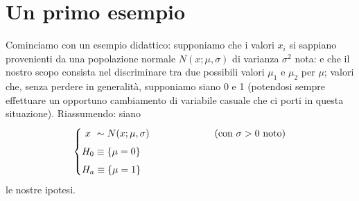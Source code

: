 \section{Un primo esempio}%
\label{ch:13.es1}
Cominciamo con un esempio didattico: supponiamo che i valori
$x_i$ si sappiano provenienti da una popolazione normale
$N(x; \mu, \sigma)$ di varianza $\sigma^2$ nota: e che il
nostro scopo consista nel discriminare tra due possibili
valori $\mu_1$ e $\mu_2$ per $\mu$; valori che, senza
perdere in generalit\`a, supponiamo siano 0 e 1 (potendosi
sempre effettuare un opportuno cambiamento di variabile
casuale che ci porti in questa situazione).  Riassumendo:
siano
\begin{equation*}
  \begin{cases}
    \setbox0=\hbox{$H_0$}
    \makebox[\wd0]{$x$} \sim N(x; \mu, \sigma)
    &\text{\hspace{2cm}(con $\sigma > 0$ noto)} \\[1ex]
    H_0 \equiv \{ \mu = 0 \} \\[1ex]
    H_a \equiv \{ \mu = 1 \}
  \end{cases}
\end{equation*}
le nostre ipotesi.

